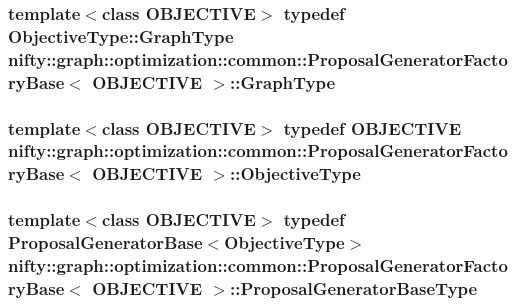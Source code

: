\subsubsection[{Graph\+Type}]{\setlength{\rightskip}{0pt plus 5cm}template$<$class O\+B\+J\+E\+C\+T\+I\+V\+E$>$ typedef Objective\+Type\+::\+Graph\+Type {\bf nifty\+::graph\+::optimization\+::common\+::\+Proposal\+Generator\+Factory\+Base}$<$ O\+B\+J\+E\+C\+T\+I\+V\+E $>$\+::{\bf Graph\+Type}}\label{classnifty_1_1graph_1_1optimization_1_1common_1_1ProposalGeneratorFactoryBase_afbc5ea0723729b327417d43729cdf084}
\hypertarget{classnifty_1_1graph_1_1optimization_1_1common_1_1ProposalGeneratorFactoryBase_aa5736d89b93a428099cc2f867266c8c7}{}
\subsubsection[{Objective\+Type}]{\setlength{\rightskip}{0pt plus 5cm}template$<$class O\+B\+J\+E\+C\+T\+I\+V\+E$>$ typedef O\+B\+J\+E\+C\+T\+I\+V\+E {\bf nifty\+::graph\+::optimization\+::common\+::\+Proposal\+Generator\+Factory\+Base}$<$ O\+B\+J\+E\+C\+T\+I\+V\+E $>$\+::{\bf Objective\+Type}}\label{classnifty_1_1graph_1_1optimization_1_1common_1_1ProposalGeneratorFactoryBase_aa5736d89b93a428099cc2f867266c8c7}
\hypertarget{classnifty_1_1graph_1_1optimization_1_1common_1_1ProposalGeneratorFactoryBase_ac2be47e9c7b7a249b3d597831c50405d}{}
\subsubsection[{Proposal\+Generator\+Base\+Type}]{\setlength{\rightskip}{0pt plus 5cm}template$<$class O\+B\+J\+E\+C\+T\+I\+V\+E$>$ typedef {\bf Proposal\+Generator\+Base}$<${\bf Objective\+Type}$>$ {\bf nifty\+::graph\+::optimization\+::common\+::\+Proposal\+Generator\+Factory\+Base}$<$ O\+B\+J\+E\+C\+T\+I\+V\+E $>$\+::{\bf Proposal\+Generator\+Base\+Type}}\label{classnifty_1_1graph_1_1optimization_1_1common_1_1ProposalGeneratorFactoryBase_ac2be47e9c7b7a249b3d597831c50405d}


